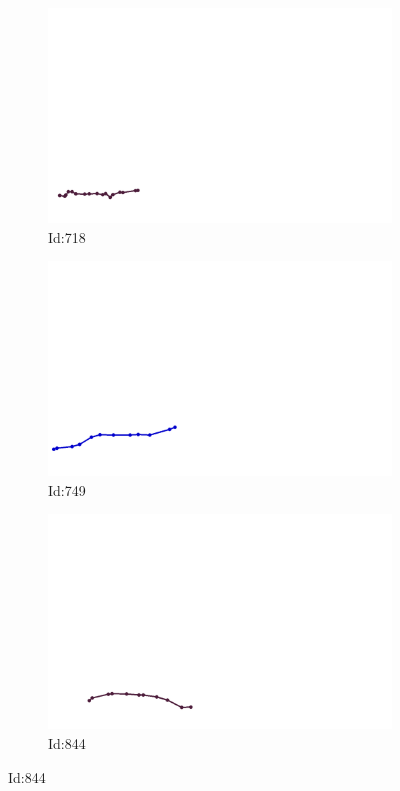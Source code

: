 \documentclass[12pt,twoside]{report}
\begin{document}
\begin{figure}
\centering
\begin{subfigure}[b]{0.20\textwidth}
\centering
\includegraphics[width=\textwidth]{../../trajectories/718.png}
\caption{Id:718}
\end{subfigure}
\begin{subfigure}[b]{0.20\textwidth}
\centering
\includegraphics[width=\textwidth]{../../trajectories/749.png}
\caption{Id:749}
\end{subfigure}
\begin{subfigure}[b]{0.20\textwidth}
\centering
\includegraphics[width=\textwidth]{../../trajectories/844.png}
\caption{Id:844}
\end{subfigure}
\end{figure}
\end{document}
